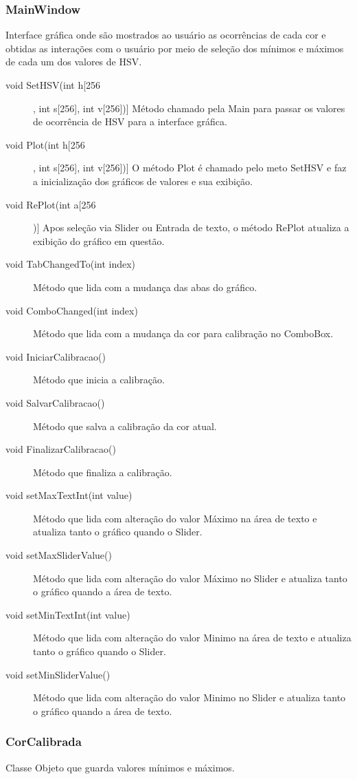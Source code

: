 	\subsubsection{MainWindow}
	Interface gráfica onde são mostrados ao usuário as ocorrências de cada cor e obtidas as interações com o usuário por meio de seleção dos mínimos e máximos de cada um dos valores de HSV.  
	\begin{description}
		\item [void SetHSV(int h[256] , int s[256], int v[256])] Método chamado pela Main para passar os valores de ocorrência de HSV para a interface gráfica.
		\item[ void Plot(int h[256] , int s[256], int v[256])]
		 O método Plot é chamado pelo meto SetHSV e faz a inicialização dos gráficos de valores e sua exibição.
		\item [void RePlot(int a[256])]
		 Apos seleção via Slider ou Entrada de texto, o método RePlot atualiza a exibição do gráfico em questão.
		\item [void TabChangedTo(int index)]
		 Método que lida com a mudança das abas do gráfico.
		\item [void ComboChanged(int index)]
		 Método que lida com a mudança da cor para calibração no ComboBox.
		\item [void IniciarCalibracao()]
		Método que inicia a calibração.
		\item [void SalvarCalibracao()]
		Método que salva a calibração da cor atual.
		\item [void FinalizarCalibracao()]
		Método que finaliza a calibração.		
		\item [void setMaxTextInt(int value)]
		 Método que lida com alteração do valor Máximo na área de texto e atualiza tanto o gráfico quando o Slider.
		\item [void setMaxSliderValue()]
		 Método que lida com alteração do valor Máximo no Slider e atualiza tanto o gráfico quando a área de texto.
		\item [void setMinTextInt(int value)]
		 Método que lida com alteração do valor Minimo na área de texto e atualiza tanto o gráfico quando o Slider.
		\item [void setMinSliderValue()]
		  Método que lida com alteração do valor Minimo no Slider e atualiza tanto o gráfico quando a área de texto.

	\end{description}
	\subsubsection{CorCalibrada}
	Classe Objeto que guarda valores mínimos e máximos.
	\newpage

